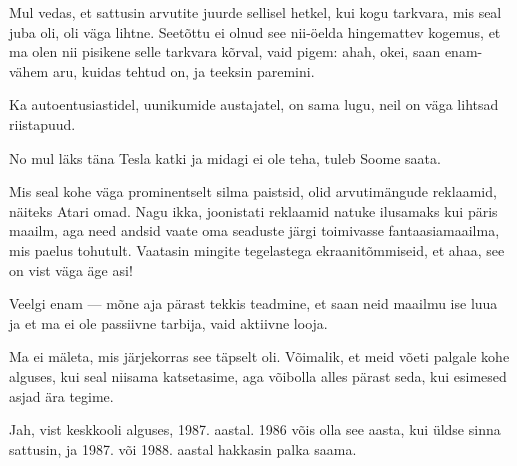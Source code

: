 
Mul vedas, et sattusin arvutite juurde sellisel 
hetkel, kui kogu tarkvara, mis seal juba oli, oli väga lihtne. 
Seetõttu ei olnud see nii-öelda hingemattev kogemus, et ma olen nii 
pisikene selle tarkvara kõrval, vaid pigem: ahah, okei, saan enam-vähem 
aru, kuidas tehtud on, ja teeksin paremini.


Ka autoentusiastidel, uunikumide austajatel, on sama lugu, neil on 
väga lihtsad riistapuud.


No mul läks täna Tesla katki ja midagi ei ole teha, tuleb Soome saata.


Mis seal kohe väga prominentselt silma paistsid, olid 
arvutimängude reklaamid, näiteks Atari omad. Nagu 
ikka, joonistati reklaamid natuke ilusamaks kui päris maailm, aga 
need andsid vaate oma seaduste järgi toimivasse fantaasiamaailma, 
mis paelus tohutult. Vaatasin mingite tegelastega ekraanitõmmiseid, et ahaa, see on vist väga äge asi!


Veelgi enam --- mõne aja pärast tekkis teadmine, et saan neid maailmu ise luua ja et ma ei ole passiivne tarbija, vaid aktiivne looja.


Ma ei mäleta, mis järjekorras see täpselt oli. Võimalik, et meid võeti palgale 
kohe alguses, kui seal niisama katsetasime, aga võibolla alles
pärast seda, kui esimesed asjad ära tegime.


Jah, vist keskkooli alguses, 1987. aastal. 1986 võis olla see aasta, kui üldse sinna 
sattusin, ja 1987. või 1988. aastal hakkasin palka saama. 


